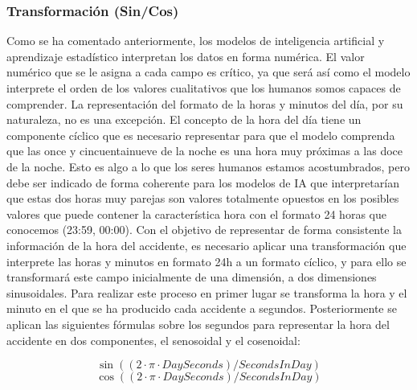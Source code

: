 \documentclass{uathesis-es}
\begin{document}
	
	\subsubsection{Transformación (Sin/Cos)}
	
	
	Como se ha comentado anteriormente, los modelos de inteligencia artificial y aprendizaje estadístico interpretan los datos en forma numérica. El valor numérico que se le asigna a cada campo es crítico, ya que será así como el modelo interprete el orden de los valores cualitativos que los humanos somos capaces de comprender. La representación del formato de la horas y minutos del día, por su naturaleza, no es una excepción. El concepto de la hora del día tiene un componente cíclico que es necesario representar para que el modelo comprenda que las once y cincuentainueve de la noche es una hora muy próximas a las doce de la noche. Esto es algo a lo que los seres humanos estamos acostumbrados, pero debe ser indicado de forma coherente para los modelos de IA que interpretarían que estas dos horas muy parejas son valores totalmente opuestos en los posibles valores que puede contener la característica hora con el formato 24 horas que conocemos (23:59, 00:00). Con el objetivo de representar de forma consistente la información de la hora del accidente, es necesario aplicar una transformación que interprete las horas y minutos en formato 24h a un formato cíclico, y para ello se transformará este campo inicialmente de una dimensión, a dos dimensiones sinusoidales. Para realizar este proceso en primer lugar se transforma la hora y el minuto en el que se ha producido cada accidente a segundos. Posteriormente se aplican las siguientes fórmulas sobre los segundos para representar la hora del accidente en dos componentes, el senosoidal y el cosenoidal:
	
	
	\begin{equation}
		\sin((2 \cdot \pi \cdot DaySeconds)/SecondsInDay)
	\end{equation}
	\begin{equation}
		\cos((2 \cdot \pi \cdot DaySeconds)/SecondsInDay)
	\end{equation}
	
	
\end{document}
